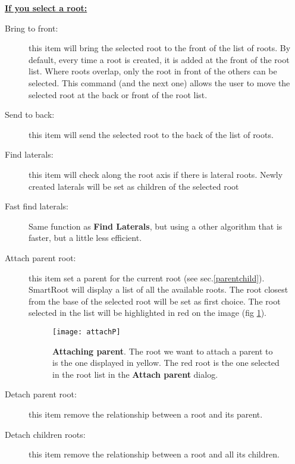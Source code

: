 \documentclass[a4paper,english,10pt]{report}
\begin{document}
\noindent \underline{\textbf{If you select a root:}}\\

\begin{description}

\item[Bring to front:] this item will bring the selected root to the front of the list of roots. By default, every time a root is created, it is added at the front of the root list. Where roots overlap, only the root in front of the others can be selected. This command (and the next one) allows the user to move the selected root at the back or front of the root list.

\item[Send to back:] this item will send the selected root to the back of the list of roots.

\item[Find laterals:] this item will check along the root axis if there is lateral roots. Newly created laterals will be set as children of the selected root

\item[Fast find laterals:] Same function as \textbf{Find Laterals}, but using a other algorithm that is faster, but a little less efficient.

\item[Attach parent root:] this item set a parent for the current root (see sec.\ref{parentchild}). SmartRoot will display a list of all the available roots. The root closest from the base of the selected root will be set as first choice. The root selected in the list will be highlighted in red on the image (fig \ref{attachP}).

\begin{figure}[h]
\begin{center}
\texttt{[image: attachP]}
\caption[Attaching parent]{\textbf{Attaching parent}. The root we want to attach a parent to is the one displayed in yellow. The red root is the one selected in the root list in the \textbf{Attach parent} dialog.}
\label{attachP}
\end{center}
\end{figure}

\item[Detach parent root:] this item remove the relationship between a root and its parent.

\item[Detach children roots:] this item remove the relationship between a root and all its children.


\end{description}
\end{document}
